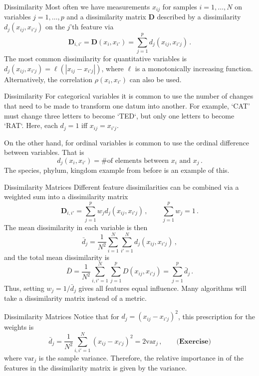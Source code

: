 \documentclass[10pt, table, dvipsnames,xcdraw,handout]{beamer}
\newcommand{\bfD}{\ensuremath{\mathbf{D}}}
\begin{document}
\begin{frame}[fragile]{Dissimilarity}
Most often we have measurements $x_{ij}$ for samples $i = 1,\ldots, N$ on variables $j=1,\ldots, p$ and a dissimilarity matrix $\bfD$ described by a dissimilarity $d_j(x_{ij},x_{i'j})$ on the $j$'th feature via
$$
\bfD_{i,i'} = \bfD(x_i,x_{i'}) = \sum_{j=1}^p d_j(x_{ij},x_{i'j})\,.
$$\pause
The most common dissimilarity for quantitative variables is $d_j(x_{ij},x_{i'j}) = \ell (|x_{ij}-x_{i'j}|)$, where $\ell$ is a monotonically increasing function. \pause Alternatively, the correlation $\rho(x_i, x_{i'})$ can also be used.
\end{frame}


\begin{frame}[fragile]{Dissimilarity}
For categorical variables it is common to use the number of changes that need to be made to transform one datum into another. For example, `CAT' must change three letters to become `TED`, but only one letters to become `RAT`. \pause Here, each $d_j = 1$ iff $x_{ij}=x_{i'j}$. \pause

On the other hand, for ordinal variables is common to use the ordinal difference between variables. That is 
$$
d_j(x_i,x_{i'}) =  \# \text{of elements between $x_i$ and $x_j$}\,.
$$
The species, phylum, kingdom example from before is an example of this. 
\end{frame}



\begin{frame}[fragile]{Dissimilarity Matrices}
Different feature dissimilarities can be combined via a weighted sum into a dissimilarity matrix
$$
\bfD_{i,i'} =  \sum_{j=1}^p w_j d_j(x_{ij},x_{i'j})\,,\hspace{2em} \sum_{j=1}^p w_j = 1\,.
$$\pause
The mean dissimilarity in each variable is then 
$$
\bar d_j  = \frac{1}{N^2}\sum_{i=1}^N\sum_{i'=1}^N  d_j(x_{ij},x_{i'j})\,,
$$
and the total mean dissimilarity is 
$$
\bar D  = \frac{1}{N^2}\sum_{i,i'=1}^N\sum_{j=1}^p D(x_{ij},x_{i'j}) = \sum_{j=1}^p \bar d_j\,.
$$\pause
Thus, setting $w_j = 1/\bar d_j$ gives all features equal influence. Many algorithms will take a dissimilarity matrix instead of a metric. 
\end{frame}




\begin{frame}[fragile]{Dissimilarity Matrices}
Notice that for $d_j = (x_{ij} - x_{i'j})^2$, this prescription for the weights is
$$
\bar d_j = \frac{1}{N^2}\sum_{i,i'=1}^N (x_{ij} - x_{i'j})^2 = 2 \text{var}_j\,,\hspace{2em} \textbf{(Exercise)}
$$
where $\text{var}_j$ is the sample variance. \pause Therefore, the relative importance in of the features in the dissimilarity matrix is given by the variance. 
\end{frame}
\end{document}
